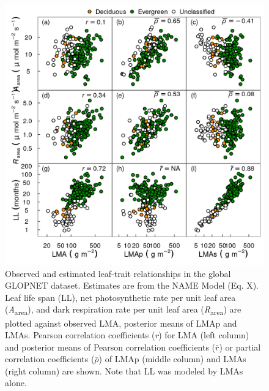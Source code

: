 \documentclass[
  12pt,
  a4paper,
,tablecaptionabove
]{scrartcl}
\begin{document}
\begin{figure}

{\centering \includegraphics{../figs/gl_point.png}

}

\caption{\label{fig-GLplt}Observed and estimated leaf-trait
relationships in the global GLOPNET dataset. Estimates are from the NAME
Model (Eq. X). Leaf life span (LL), net photosynthetic rate per unit
leaf area (\emph{A}\textsubscript{area}), and dark respiration rate per
unit leaf area (\emph{R}\textsubscript{area}) are plotted against
observed LMA, posterior means of LMAp and LMAs. Pearson correlation
coefficients (\emph{r}) for LMA (left column) and posterior means of
Pearson correlation coefficients (\(\bar{r}\)) or partial correlation
coefficients (\(\bar{\rho}\)) of LMAp (middle column) and LMAs (right
column) are shown. Note that LL was modeled by LMAs alone.}

\end{figure}

\newpage
\end{document}

